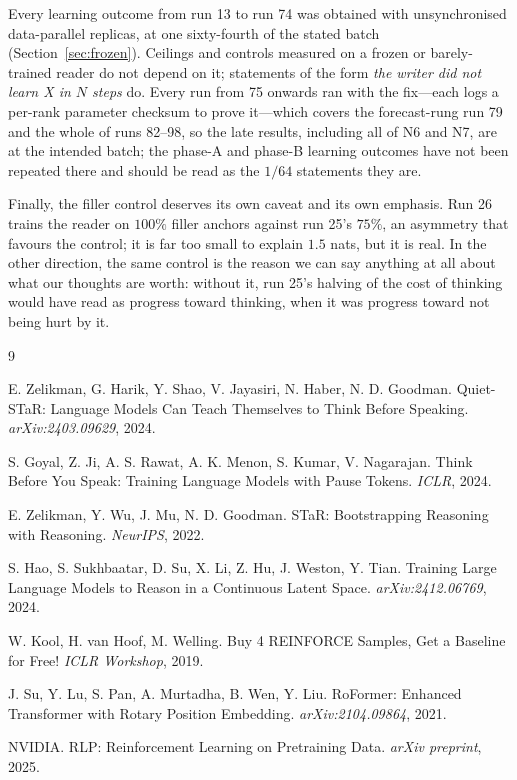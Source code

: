 \documentclass{article} %
\begin{document}
Every learning outcome from run 13 to run 74 was obtained with unsynchronised data-parallel replicas, at one sixty-fourth of the stated batch (Section~\ref{sec:frozen}). Ceilings and controls measured on a frozen or barely-trained reader do not depend on it; statements of the form \emph{the writer did not learn X in $N$ steps} do. Every run from 75 onwards ran with the fix---each logs a per-rank parameter checksum to prove it---which covers the forecast-rung run 79 and the whole of runs 82--98, so the late results, including all of N6 and N7, are at the intended batch; the phase-A and phase-B learning outcomes have not been repeated there and should be read as the $1/64$ statements they are.

Finally, the filler control deserves its own caveat and its own emphasis. Run 26 trains the reader on $100\%$ filler anchors against run 25's $75\%$, an asymmetry that favours the control; it is far too small to explain $1.5$ nats, but it is real. In the other direction, the same control is the reason we can say anything at all about what our thoughts are worth: without it, run 25's halving of the cost of thinking would have read as progress toward thinking, when it was progress toward not being hurt by it.

\begin{thebibliography}{9}

E. Zelikman, G. Harik, Y. Shao, V. Jayasiri, N. Haber, N. D. Goodman.
\newblock Quiet-STaR: Language Models Can Teach Themselves to Think Before Speaking.
\newblock \emph{arXiv:2403.09629}, 2024.

S. Goyal, Z. Ji, A. S. Rawat, A. K. Menon, S. Kumar, V. Nagarajan.
\newblock Think Before You Speak: Training Language Models with Pause Tokens.
\newblock \emph{ICLR}, 2024.

E. Zelikman, Y. Wu, J. Mu, N. D. Goodman.
\newblock STaR: Bootstrapping Reasoning with Reasoning.
\newblock \emph{NeurIPS}, 2022.

S. Hao, S. Sukhbaatar, D. Su, X. Li, Z. Hu, J. Weston, Y. Tian.
\newblock Training Large Language Models to Reason in a Continuous Latent Space.
\newblock \emph{arXiv:2412.06769}, 2024.

W. Kool, H. van Hoof, M. Welling.
\newblock Buy 4 REINFORCE Samples, Get a Baseline for Free!
\newblock \emph{ICLR Workshop}, 2019.

J. Su, Y. Lu, S. Pan, A. Murtadha, B. Wen, Y. Liu.
\newblock RoFormer: Enhanced Transformer with Rotary Position Embedding.
\newblock \emph{arXiv:2104.09864}, 2021.

NVIDIA.
\newblock RLP: Reinforcement Learning on Pretraining Data.
\newblock \emph{arXiv preprint}, 2025.

\end{thebibliography}
\end{document}
